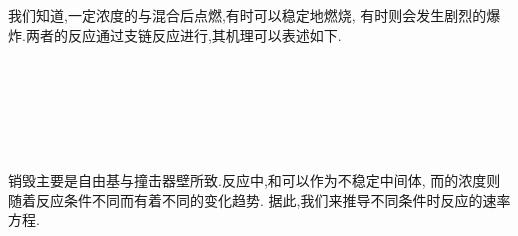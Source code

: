 \documentclass{ctexart}
\begin{document}
\indent 我们知道,一定浓度的与混合后点燃,有时可以稳定地燃烧,%
有时则会发生剧烈的爆炸.两者的反应通过支链反应进行,其机理可以表述如下.
\begin{tightcenter}
    \\
    \\
    \\
    \\
    \\
\end{tightcenter}
销毁主要是自由基与撞击器壁所致.反应中,和可以作为不稳定中间体,%
而的浓度则随着反应条件不同而有着不同的变化趋势.%
据此,我们来推导不同条件时反应的速率方程.
\end{document}
